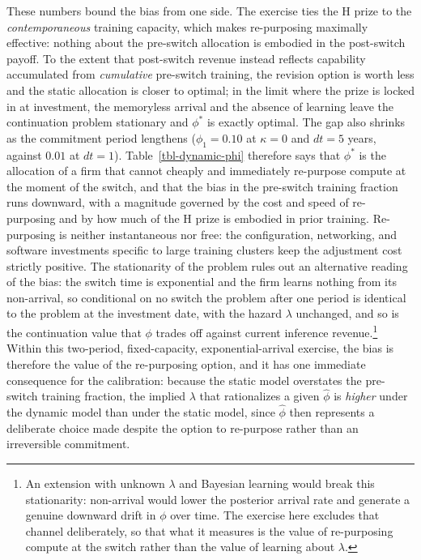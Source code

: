\documentclass[
  11pt,
  letterpaper,
]{scrartcl}
\begin{document}
These numbers bound the bias from one side. The exercise ties the H
prize to the \emph{contemporaneous} training capacity, which makes
re-purposing maximally effective: nothing about the pre-switch
allocation is embodied in the post-switch payoff. To the extent that
post-switch revenue instead reflects capability accumulated from
\emph{cumulative} pre-switch training, the revision option is worth less
and the static allocation is closer to optimal; in the limit where the
prize is locked in at investment, the memoryless arrival and the absence
of learning leave the continuation problem stationary and \(\phi^*\) is
exactly optimal. The gap also shrinks as the commitment period lengthens
(\(\phi_1 = 0.10\) at \(\kappa = 0\) and \(dt = 5\) years, against
\(0.01\) at \(dt = 1\)). Table~\ref{tbl-dynamic-phi} therefore says that
\(\phi^*\) is the allocation of a firm that cannot cheaply and
immediately re-purpose compute at the moment of the switch, and that the
bias in the pre-switch training fraction runs downward, with a magnitude
governed by the cost and speed of re-purposing and by how much of the H
prize is embodied in prior training. Re-purposing is neither
instantaneous nor free: the configuration, networking, and software
investments specific to large training clusters keep the adjustment cost
strictly positive. The stationarity of the problem rules out an
alternative reading of the bias: the switch time is exponential and the
firm learns nothing from its non-arrival, so conditional on no switch
the problem after one period is identical to the problem at the
investment date, with the hazard \(\lambda\) unchanged, and so is the
continuation value that \(\phi\) trades off against current inference
revenue.\footnote{An extension with unknown \(\lambda\) and Bayesian
  learning would break this stationarity: non-arrival would lower the
  posterior arrival rate and generate a genuine downward drift in
  \(\phi\) over time. The exercise here excludes that channel
  deliberately, so that what it measures is the value of re-purposing
  compute at the switch rather than the value of learning about
  \(\lambda\).} Within this two-period, fixed-capacity,
exponential-arrival exercise, the bias is therefore the value of the
re-purposing option, and it has one immediate consequence for the
calibration: because the static model overstates the pre-switch training
fraction, the implied \(\lambda\) that rationalizes a given
\(\hat{\phi}\) is \emph{higher} under the dynamic model than under the
static model, since \(\hat{\phi}\) then represents a deliberate choice
made despite the option to re-purpose rather than an irreversible
commitment.
\end{document}
